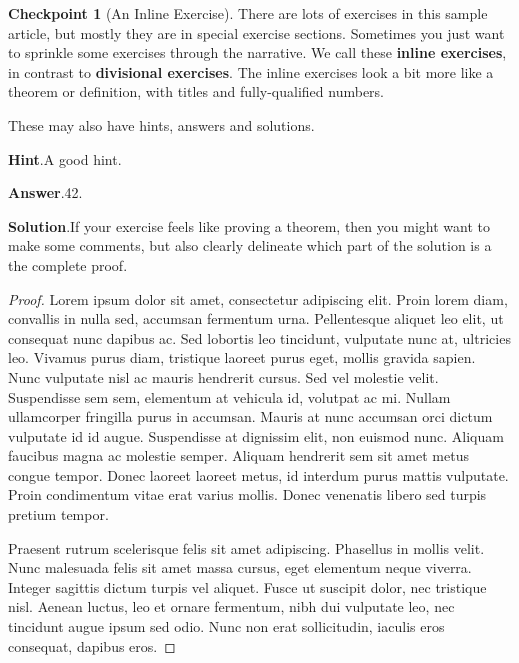 \documentclass{amsart}
\theoremstyle{plain}%
\theoremstyle{definition}%
\newtheorem{inlineexercise}[theorem]{Checkpoint}
\theoremstyle{remark}%
\newcommand{\blocktitlefont}{\relax}
\newcommand{\terminology}[1]{\textbf{#1}}
\numberwithin{equation}{section}
\begin{document}
\begin{inlineexercise}[An Inline Exercise]\label{inline-exercise}%
%
There are lots of exercises in this sample article, but mostly they are in special exercise sections.  Sometimes you just want to sprinkle some exercises through the narrative.  We call these \terminology{inline exercises}, in contrast to \terminology{divisional exercises}.  The inline exercises look a bit more like a theorem or definition, with titles and fully-qualified numbers.%
\par
These may also have hints, answers and solutions.%
\par\smallskip%
\noindent\textbf{\blocktitlefont Hint}.\hypertarget{inline-exercise-3}{}\quad{}A good hint.%
\par\smallskip%
\noindent\textbf{\blocktitlefont Answer}.\hypertarget{inline-exercise-4}{}\quad{}42.%
\par\smallskip%
\noindent\textbf{\blocktitlefont Solution}.\hypertarget{inline-exercise-5}{}\quad{}If your exercise feels like proving a theorem, then you might want to make some comments, but also clearly delineate which part of the solution is a the complete proof.%
\begin{proof}\label{inline-exercise-5-2}%
Lorem ipsum dolor sit amet, consectetur adipiscing elit. Proin lorem diam, convallis in nulla sed, accumsan fermentum urna. Pellentesque aliquet leo elit, ut consequat nunc dapibus ac. Sed lobortis leo tincidunt, vulputate nunc at, ultricies leo. Vivamus purus diam, tristique laoreet purus eget, mollis gravida sapien. Nunc vulputate nisl ac mauris hendrerit cursus. Sed vel molestie velit. Suspendisse sem sem, elementum at vehicula id, volutpat ac mi. Nullam ullamcorper fringilla purus in accumsan. Mauris at nunc accumsan orci dictum vulputate id id augue. Suspendisse at dignissim elit, non euismod nunc. Aliquam faucibus magna ac molestie semper. Aliquam hendrerit sem sit amet metus congue tempor. Donec laoreet laoreet metus, id interdum purus mattis vulputate. Proin condimentum vitae erat varius mollis. Donec venenatis libero sed turpis pretium tempor.%
\par
Praesent rutrum scelerisque felis sit amet adipiscing. Phasellus in mollis velit. Nunc malesuada felis sit amet massa cursus, eget elementum neque viverra. Integer sagittis dictum turpis vel aliquet. Fusce ut suscipit dolor, nec tristique nisl. Aenean luctus, leo et ornare fermentum, nibh dui vulputate leo, nec tincidunt augue ipsum sed odio. Nunc non erat sollicitudin, iaculis eros consequat, dapibus eros.%
\end{proof}
\end{inlineexercise}%
\end{document}
